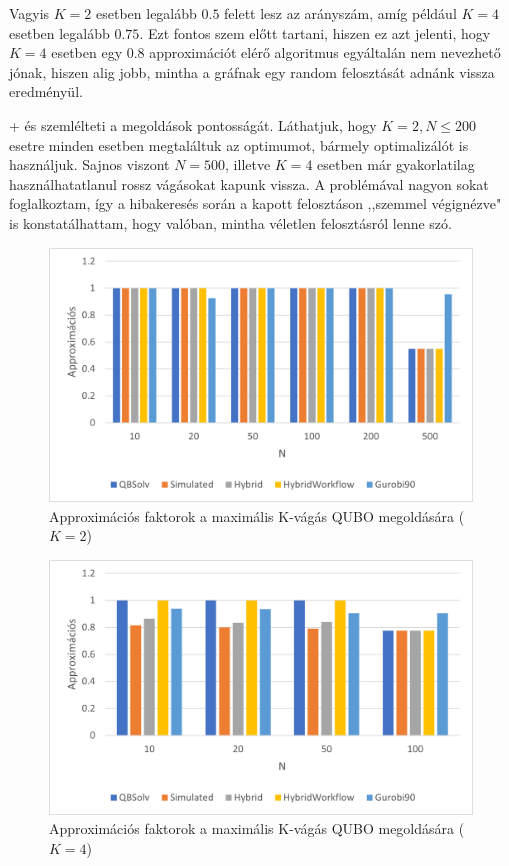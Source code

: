 Vagyis $K=2$ esetben legalább $0.5$ felett lesz az arányszám, amíg például $K=4$ esetben legalább $0.75$. Ezt fontos szem előtt tartani, hiszen ez azt jelenti, hogy $K=4$ esetben egy $0.8$ approximációt elérő algoritmus egyáltalán nem nevezhető jónak, hiszen alig jobb, mintha a gráfnak egy random felosztását adnánk vissza eredményül.

\Az+ és  szemlélteti a megoldások pontosságát. Láthatjuk, hogy $K=2, N \leq 200$ esetre minden esetben megtaláltuk az optimumot, bármely optimalizálót is használjuk. Sajnos viszont $N=500$, illetve $K=4$ esetben már gyakorlatilag használhatatlanul rossz vágásokat kapunk vissza. A problémával nagyon sokat foglalkoztam, így a hibakeresés során a kapott felosztáson ,,szemmel végignézve" is konstatálhattam, hogy valóban, mintha véletlen felosztásról lenne szó.

\begin{figure}[!ht]
	\centering
	\includegraphics[width=150mm, keepaspectratio]{figures/diagrams/maxKCutQUBO_K2approx.png}
	\caption{Approximációs faktorok a maximális K-vágás QUBO megoldására ($K=2$)}
	\label{fig:maxKCutQUBO_K2approx}
\end{figure}

\begin{figure}[!ht]
	\centering
	\includegraphics[width=150mm, keepaspectratio]{figures/diagrams/maxKCutQUBO_K4approx.png}
	\caption{Approximációs faktorok a maximális K-vágás QUBO megoldására ($K=4$)}
	\label{fig:maxKCutQUBO_K4approx}
\end{figure}

